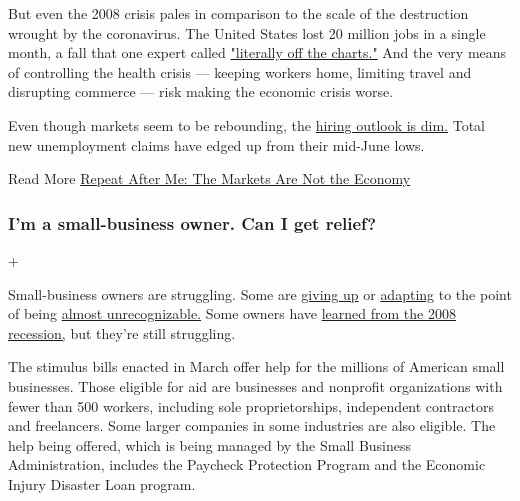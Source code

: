 But even the 2008 crisis pales in comparison to the scale of the
destruction wrought by the coronavirus. The United States lost 20
million jobs in a single month, a fall that one expert called
\href{https://www.nytimes3xbfgragh.onion/interactive/2020/05/08/business/economy/april-jobs-report.html}{"literally
off the charts."} And the very means of controlling the health crisis
--- keeping workers home, limiting travel and disrupting commerce ---
risk making the economic crisis worse.

Even though markets seem to be rebounding, the
\href{https://www.nytimes3xbfgragh.onion/2020/07/09/business/economy/unemployment-claims-coronavirus.html}{hiring
outlook is dim.} Total new unemployment claims have edged up from their
mid-June lows.

Read More
\href{https://www.nytimes3xbfgragh.onion/2020/05/10/business/stock-market-economy-coronavirus.html}{Repeat
After Me: The Markets Are Not the Economy}

\hypertarget{im-a-small-business-owner-can-i-get-relief}{%
\subsubsection{I'm a small-business owner. Can I get
relief?}\label{im-a-small-business-owner-can-i-get-relief}}

+

Small-business owners are struggling. Some are
\href{https://www.nytimes3xbfgragh.onion/2020/07/13/business/small-businesses-coronavirus.html}{giving
up} or
\href{https://www.nytimes3xbfgragh.onion/2020/06/26/business/small-business-coronavirus-survival.html}{adapting}
to the point of being
\href{https://www.nytimes3xbfgragh.onion/2020/05/18/business/small-business-coronavirus-pandemic-mikes-organic.html}{almost
unrecognizable.} Some owners have
\href{https://www.nytimes3xbfgragh.onion/2020/06/23/business/coronavirus-great-recession-2008-lessons.html}{learned
from the 2008 recession,} but they're still struggling.

The stimulus bills enacted in March offer help for the millions of
American small businesses. Those eligible for aid are businesses and
nonprofit organizations with fewer than 500 workers, including sole
proprietorships, independent contractors and freelancers. Some larger
companies in some industries are also eligible. The help being offered,
which is being managed by the Small Business Administration, includes
the Paycheck Protection Program and the Economic Injury Disaster Loan
program.

